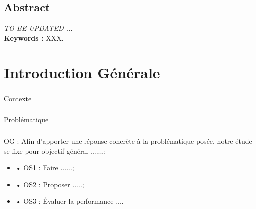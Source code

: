 \documentclass[12pt]{report}
\begin{document}
 \section*{Abstract}
\textsl{\colorbox[rgb]{1,1,0}{TO BE UPDATED ...}}
\\
\textbf{Keywords :}  XXX.
\thispagestyle{fancy}



%
\setcounter{page}{6}
\newpage
{}
\setcounter{page}{7}
\thispagestyle{fancy}

\newpage 
\listoffigures
\thispagestyle{fancy}
\newpage 
\listoftables
\thispagestyle{fancy}



 
\newpage
{}
\chapter*{Introduction Générale}
\thispagestyle{fancy}
\setcounter{page}{1}
\paragraph{}Contexte 
\paragraph{}Problématique 
\paragraph{}OG : Afin d’apporter une réponse concrète à la problématique posée, notre étude se fixe pour objectif général .......:
\begin{itemize} 
    \item•	OS1 : Faire ......;
    \item•	OS2 : Proposer .....;
    \item•	OS3 : Évaluer la performance ....
\end{itemize}
\end{document}
